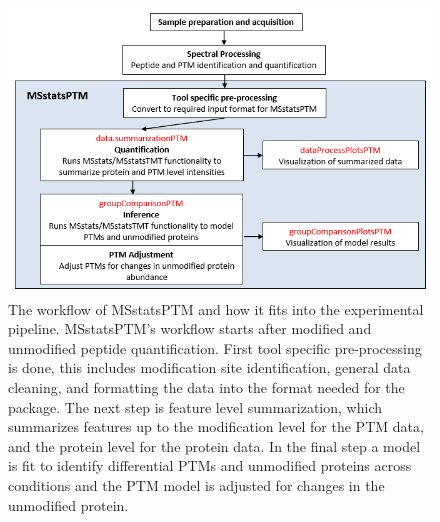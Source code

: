 \documentclass[mcp]{article}
\numberwithin{table}{section}
\begin{document}
\begin{figure}[ht]
\centering
\includegraphics[scale=.8]{images/MSstatsPTM_design.png}
\caption{The workflow of MSstatsPTM and how it fits into the experimental pipeline. MSstatsPTM's workflow starts after modified and unmodified peptide quantification. First tool specific pre-processing is done, this includes modification site identification, general data cleaning, and formatting the data into the format needed for the package. The next step is feature level summarization, which summarizes features up to the modification level for the PTM data, and the protein level for the protein data. In the final step a model is fit to identify differential PTMs and unmodified proteins across conditions and the PTM model is adjusted for changes in the unmodified protein.}
\label{fig:msstatsptm_design}
\end{figure}
\end{document}
